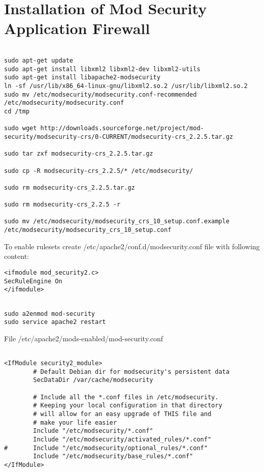 \section{Installation of Mod Security Application Firewall}
\begin{verbatim}

sudo apt-get update
sudo apt-get install libxml2 libxml2-dev libxml2-utils
sudo apt-get install libapache2-modsecurity
ln -sf /usr/lib/x86_64-linux-gnu/libxml2.so.2 /usr/lib/libxml2.so.2
sudo mv /etc/modsecurity/modsecurity.conf-recommended /etc/modsecurity/modsecurity.conf
cd /tmp
 
sudo wget http://downloads.sourceforge.net/project/mod-security/modsecurity-crs/0-CURRENT/modsecurity-crs_2.2.5.tar.gz
 
sudo tar zxf modsecurity-crs_2.2.5.tar.gz
 
sudo cp -R modsecurity-crs_2.2.5/* /etc/modsecurity/
 
sudo rm modsecurity-crs_2.2.5.tar.gz
 
sudo rm modsecurity-crs_2.2.5 -r
 
sudo mv /etc/modsecurity/modsecurity_crs_10_setup.conf.example /etc/modsecurity/modsecurity_crs_10_setup.conf 
\end{verbatim}


To enable rulesets create /etc/apache2/conf.d/modsecurity.conf file with following content:
\begin{verbatim}
<ifmodule mod_security2.c>
SecRuleEngine On
</ifmodule>
\end{verbatim} 
\begin{verbatim}
 
sudo a2enmod mod-security
sudo service apache2 restart

\end{verbatim}


File /etc/apache2/mods-enabled/mod-security.conf
\begin{verbatim}

<IfModule security2_module>
        # Default Debian dir for modsecurity's persistent data
        SecDataDir /var/cache/modsecurity
 
        # Include all the *.conf files in /etc/modsecurity.
        # Keeping your local configuration in that directory
        # will allow for an easy upgrade of THIS file and
        # make your life easier
        Include "/etc/modsecurity/*.conf"
        Include "/etc/modsecurity/activated_rules/*.conf"
#       Include "/etc/modsecurity/optional_rules/*.conf"
        Include "/etc/modsecurity/base_rules/*.conf"
</IfModule>
\end{verbatim} 

